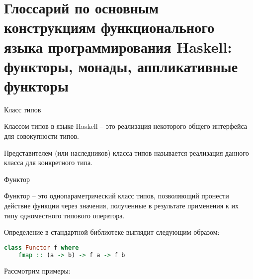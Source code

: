 \section{Глоссарий по основным конструкциям функционального языка программирования Haskell: функторы, монады, аппликативные функторы}

\begin{defin} Класс типов

  Классом типов в языке Haskell -- это реализация некоторого общего интерфейса для совокупности типов.

  Представителем (или наследников) класса типов называется реализация данного класса для конкретного типа.
\end{defin}

\begin{defin} Функтор

  Функтор -- это однопараметрический класс типов, позволяющий пронести действие функции через значения,
  полученные в результате применения к их типу одноместного типового оператора.
\end{defin}

Определение в стандартной
библиотеке выглядит следующим образом:

\begin{lstlisting}[language=Haskell]
  class Functor f where
    fmap :: (a -> b) -> f a -> f b
\end{lstlisting}

Рассмотрим примеры:

